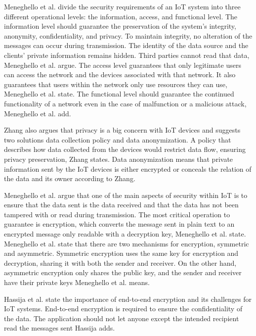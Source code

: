 Meneghello et al. divide the security requirements of an IoT system into three different operational levels: the information, access, and functional level.
The information level should guarantee the preservation of the system's integrity, anonymity, confidentiality, and privacy\cite{Meneghello2019}.
To maintain integrity, no alteration of the messages can occur during transmission. The identity of the data source and the clients' private information remains hidden. Third parties cannot read that data, Meneghello et al. argue.
The access level guarantees that only legitimate users can access the network and the devices associated with that network. 
It also guarantees that users within the network only use resources they can use, Meneghello et al. state.
The functional level should guarantee the continued functionality of a network even in the case of malfunction or a malicious attack, Meneghello et al. add.

Zhang also argues that privacy is a big concern with IoT devices and suggests two solutions data collection policy and data anonymization\cite{Zhang2014}.
A policy that describes how data collected from the devices would restrict data flow, ensuring privacy preservation, Zhang states.
Data anonymization means that private information sent by the IoT devices is either encrypted or conceals the relation of the data and its owner according to Zhang.

Meneghello et al. argue that one of the main aspects of security within IoT is to ensure that the data sent is the data received and that the data has not been tampered with or read during transmission\cite{Meneghello2019}.
The most critical operation to guarantee is encryption, which converts the message sent in plain text to an encrypted message only readable with a decryption key, Meneghello et al. state.
Meneghello et al. state that there are two mechanisms for encryption, symmetric and asymmetric.
Symmetric encryption uses the same key for encryption and decryption, sharing it with both the sender and receiver.
On the other hand, asymmetric encryption only shares the public key, and the sender and receiver have their private keys Meneghello et al. means.

Hassija et al. state the importance of end-to-end encryption and its challenges for IoT systems\cite{Hassija2019}.
End-to-end encryption is required to ensure the confidentiality of the data. The application should not let anyone except the intended recipient read the messages sent Hassija adds.


